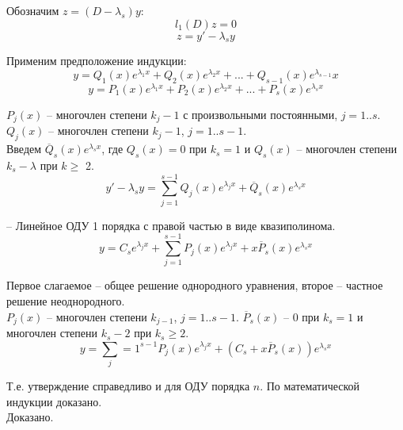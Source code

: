\documentclass{article}
\begin{document}
	Обозначим $z=(D-\lambda_s)y$:
	\begin{equation}
		l_1(D)z = 0
	\end{equation}
	\begin{equation}
		z = y'-\lambda_sy
	\end{equation}

	Применим предположение индукции:
	\begin{equation}
		y = Q_1(x)e^{\lambda_1x} + Q_2(x)e^{\lambda_2x}+...+Q_{s-1}(x)e^{\lambda_{s-1}}x
	\end{equation}
	\begin{equation}
		y = P_1(x)e^{\lambda_1x}+P_2(x)e^{\lambda_2x}+...+P_s(x)e^{\lambda_s x}
	\end{equation}

	$P_j(x)$ -- многочлен степени $k_j-1$ с произвольными постоянными, $j=1..s$. $Q_j(x)$ -- многочлен степени $k_j-1$, $j=1..s-1$.\\

	Введем $\overline Q_s(x)e^{\lambda_sx}$, где $Q_s(x)=0$ при $k_s=1$ и $Q_s(x)$ -- многочлен степени $k_s-\lambda$ при $k\geq$ 2.
	\begin{equation}
		y'-\lambda_sy = \sum_{j=1}^{s-1}Q_j(x)e^{\lambda_j x}+\overline Q_s(x)e^{\lambda_s x}
	\end{equation}

	-- Линейное ОДУ 1 порядка с правой частью в виде квазиполинома.
	\begin{equation}
		y = C_se^{\lambda_jx} + \sum_{j=1}^{s-1} P_j(x)e^{\lambda_jx} + x\overline P_s(x)e^{\lambda_sx}
	\end{equation}

	Первое слагаемое -- общее решение однородного уравнения, второе -- частное решение неоднородного.\\

	$P_j(x)$ -- многочлен степени $k_{j-1}$, $j=1..s-1$. $\overline P_s(x)$ -- $0$ при $k_s=1$ и многочлен степени $k_s-2$ при $k_s\geq 2$. 
	\begin{equation}
		y = \sum_j=1^{s-1}P_j(x)e^{\lambda_j x}+(C_s+x\overline P_s(x))e^{\lambda_s x}
	\end{equation}

	Т.е. утверждение справедливо и для ОДУ порядка $n$. По математической индукции доказано.\\

	Доказано.
\end{document}
